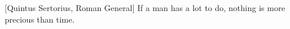 
%

\begin{ntquote}

[Quintus Sertorius, Roman General]{%
If a man has a lot to do, nothing is more precious than time.%
}

\end{ntquote}